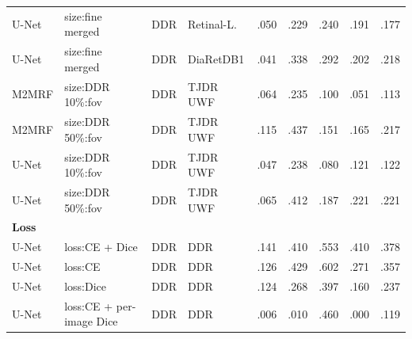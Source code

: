 \begin{landscape}
{\begin{longtable}{l l l l c c c c c}
U-Net & size:fine merged & DDR & Retinal-L. & .050 & .229 & .240 & .191 & .177 \\
U-Net & size:fine merged & DDR & DiaRetDB1 & .041 & .338 & .292 & .202 & .218 \\
M2MRF & size:DDR 10\%:fov & DDR & TJDR UWF & .064 & .235 & .100 & .051 & .113 \\
M2MRF & size:DDR 50\%:fov & DDR & TJDR UWF & .115 & .437 & .151 & .165 & .217 \\
U-Net & size:DDR 10\%:fov & DDR & TJDR UWF & .047 & .238 & .080 & .121 & .122 \\
U-Net & size:DDR 50\%:fov & DDR & TJDR UWF & .065 & .412 & .187 & .221 & .221 \\
\multicolumn{9}{l}{\textbf{Loss}}\\
U-Net & loss:CE + Dice & DDR & DDR & .141 & .410 & .553 & .410 & .378 \\
U-Net & loss:CE & DDR & DDR & .126 & .429 & .602 & .271 & .357 \\
U-Net & loss:Dice & DDR & DDR & .124 & .268 & .397 & .160 & .237 \\
U-Net & loss:CE + per-image Dice & DDR & DDR & .006 & .010 & .460 & .000 & .119 \\
\end{longtable}
}
\end{landscape}